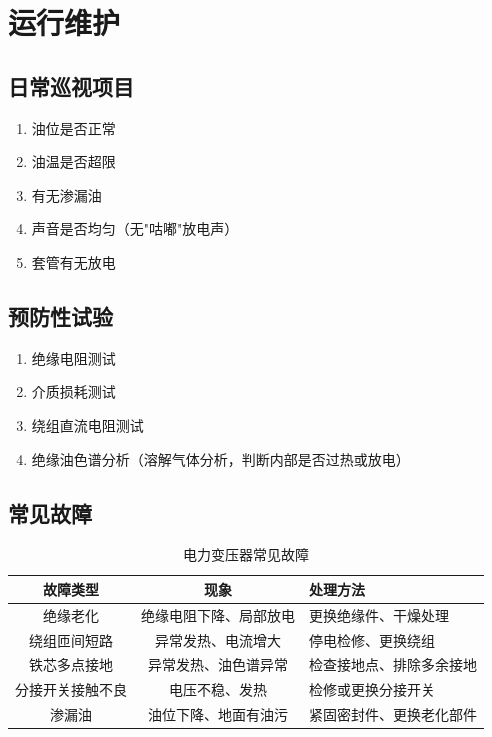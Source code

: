 \documentclass[12pt,UTF8]{ctexbook}
\begin{document}
\chapter{运行维护}
\label{chap:power_maintenance}

\section{日常巡视项目}

\begin{enumerate}
    \item 油位是否正常
    \item 油温是否超限
    \item 有无渗漏油
    \item 声音是否均匀（无"咕嘟"放电声）
    \item 套管有无放电
\end{enumerate}

\section{预防性试验}

\begin{enumerate}
    \item 绝缘电阻测试
    \item 介质损耗测试
    \item 绕组直流电阻测试
    \item 绝缘油色谱分析（溶解气体分析，判断内部是否过热或放电）
\end{enumerate}

\section{常见故障}

\begin{table}[htbp]
\centering
\caption{电力变压器常见故障}
\begin{tabular}{|c|c|p{6cm}|}
\hline
\textbf{故障类型} & \textbf{现象} & \textbf{处理方法} \\
\hline
绝缘老化 & 绝缘电阻下降、局部放电 & 更换绝缘件、干燥处理 \\
\hline
绕组匝间短路 & 异常发热、电流增大 & 停电检修、更换绕组 \\
\hline
铁芯多点接地 & 异常发热、油色谱异常 & 检查接地点、排除多余接地 \\
\hline
分接开关接触不良 & 电压不稳、发热 & 检修或更换分接开关 \\
\hline
渗漏油 & 油位下降、地面有油污 & 紧固密封件、更换老化部件 \\
\hline
\end{tabular}
\end{table}
\end{document}

